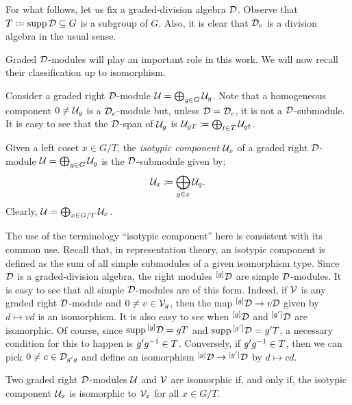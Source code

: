 For what follows, let us fix a graded-division algebra $\mathcal{D}$.
Observe that $T \coloneqq \operatorname{supp} \mathcal{D} \subseteq G$ is a subgroup of $G$. 
Also, it is clear that $\mathcal{D}_e$ is a division algebra in the usual sense. 

Graded $\mathcal{D}$-modules will play an important role in this work. 
We will now recall their classification up to isomorphism. 

Consider a graded right $\mathcal{D}$-module $\mathcal U = \bigoplus_{g\in G} \mathcal U_g$. 
Note that a homogeneous component $0\neq \mathcal U_g$ is a $\mathcal{D}_e$-module but, unless $\mathcal{D} = \mathcal{D}_e$, it is not a $\mathcal{D}$-submodule.
It is easy to see that the $\mathcal{D}$-span of $\mathcal U_g$ is $\mathcal U_{gT} \coloneqq \bigoplus_{t\in T} \mathcal U_{gt}$. 

\begin{defi}
    Given a left coset $x\in G/T$, the \emph{isotypic component} $\mathcal U_x$ of a graded right $\mathcal{D}$-module $\mathcal U = \bigoplus_{g\in G} \mathcal U_g$ is the $\mathcal{D}$-submodule given by:
    \[
        \mathcal U_{x} \coloneqq \bigoplus_{g\in x} \mathcal U_{g}.
    \]
    Clearly, $\mathcal U = \bigoplus_{x\in G/T} \mathcal U_x$.
\end{defi}


\begin{remark}
    The use of the terminology ``isotypic component'' here is consistent with its common use. 
    Recall that, in representation theory, an isotypic component is defined as the sum of all simple submodules of a given isomorphism type. 
    Since $\mathcal{D}$ is a graded-division algebra, the right modules ${}^{[g]}\mathcal{D}$ are simple $\mathcal{D}$-modules. 
    It is easy to see that all simple $\mathcal{D}$-modules are of this form.
    Indeed, if $\mathcal V$ is any graded right $\mathcal{D}$-module and $0\neq v \in \mathcal V_g$, then the map ${}^{[g]}\mathcal{D} \to v\mathcal{D}$ given by $d \mapsto vd$ is an isomorphism. 
    It is also easy to see when ${}^{[g]}\mathcal{D}$ and ${}^{[g']}\mathcal{D}$ are isomorphic. 
    Of course, since $\operatorname{supp} {}^{[g]}\mathcal{D} = gT$ and $\operatorname{supp} {}^{[g']}\mathcal{D} = g'T$, a necessary condition for this to happen is $g'g^{-1} \in T$. 
    Conversely, if $g'g^{-1} \in T$, then we can pick $0\neq c \in \mathcal{D}_{g'g}$ and define an isomorphism ${}^{[g]}\mathcal{D} \to {}^{[g']}\mathcal{D}$ by $d \mapsto cd$.
\end{remark}

\begin{lemma}\label{lemma:iso-D-modules}
    Two graded right $\mathcal{D}$-modules $\mathcal U$ and $\mathcal V$ are isomorphic if, and only if, the isotypic component $\mathcal U_x$ is isomorphic to $\mathcal V_x$ for all $x \in G/T$. 
\end{lemma}

